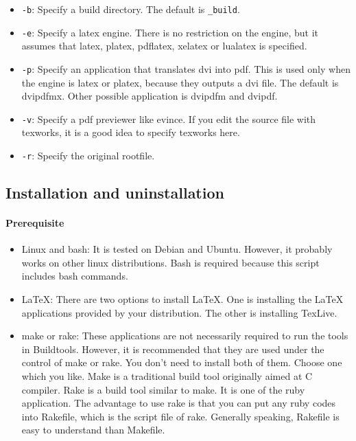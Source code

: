 \begin{itemize}
\tightlist
\item
  \texttt{-b}: Specify a build directory. The default is
  \texttt{\_build}.
\item
  \texttt{-e}: Specify a latex engine. There is no restriction on the
  engine, but it assumes that latex, platex, pdflatex, xelatex or
  lualatex is specified.
\item
  \texttt{-p}: Specify an application that translates dvi into pdf. This
  is used only when the engine is latex or platex, because they outputs
  a dvi file. The default is dvipdfmx. Other possible application is
  dvipdfm and dvipdf.
\item
  \texttt{-v}: Specify a pdf previewer like evince. If you edit the
  source file with texworks, it is a good idea to specify texworks here.
\item
  \texttt{-r}: Specify the original rootfile.
\end{itemize}

\hypertarget{installation-and-uninstallation}{%
\subsection{Installation and
uninstallation}\label{installation-and-uninstallation}}

\hypertarget{prerequisite}{%
\paragraph{Prerequisite}\label{prerequisite}}

\begin{itemize}
\item
  Linux and bash: It is tested on Debian and Ubuntu. However, it
  probably works on other linux distributions. Bash is required because
  this script includes bash commands.
\item
  LaTeX: There are two options to install LaTeX. One is installing the
  LaTeX applications provided by your distribution. The other is
  installing TexLive.
\item
  make or rake: These applications are not necessarily required to run
  the tools in Buildtools. However, it is recommended that they are used
  under the control of make or rake. You don't need to install both of
  them. Choose one which you like. Make is a traditional build tool
  originally aimed at C compiler. Rake is a build tool similar to make.
  It is one of the ruby application. The advantage to use rake is that
  you can put any ruby codes into Rakefile, which is the script file of
  rake. Generally speaking, Rakefile is easy to understand than
  Makefile.
\end{itemize}


